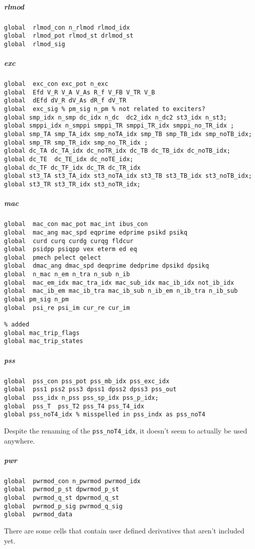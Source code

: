 \documentclass[12pt]{article}
\begin{document}
\subparagraph{rlmod}
\begin{verbatim}
global  rlmod_con n_rlmod rlmod_idx
global  rlmod_pot rlmod_st drlmod_st
global  rlmod_sig
\end{verbatim}
\subparagraph{exc}
\begin{verbatim}
global  exc_con exc_pot n_exc
global  Efd V_R V_A V_As R_f V_FB V_TR V_B
global  dEfd dV_R dV_As dR_f dV_TR
global  exc_sig % pm_sig n_pm % not related to exciters?
global smp_idx n_smp dc_idx n_dc  dc2_idx n_dc2 st3_idx n_st3;
global smppi_idx n_smppi smppi_TR smppi_TR_idx smppi_no_TR_idx ;
global smp_TA smp_TA_idx smp_noTA_idx smp_TB smp_TB_idx smp_noTB_idx;
global smp_TR smp_TR_idx smp_no_TR_idx ;
global dc_TA dc_TA_idx dc_noTR_idx dc_TB dc_TB_idx dc_noTB_idx;
global dc_TE  dc_TE_idx dc_noTE_idx;
global dc_TF dc_TF_idx dc_TR dc_TR_idx
global st3_TA st3_TA_idx st3_noTA_idx st3_TB st3_TB_idx st3_noTB_idx;
global st3_TR st3_TR_idx st3_noTR_idx;
\end{verbatim}
\subparagraph{mac}
\begin{verbatim}
global  mac_con mac_pot mac_int ibus_con
global  mac_ang mac_spd eqprime edprime psikd psikq
global  curd curq curdg curqg fldcur
global  psidpp psiqpp vex eterm ed eq
global  pmech pelect qelect
global  dmac_ang dmac_spd deqprime dedprime dpsikd dpsikq
global  n_mac n_em n_tra n_sub n_ib
global  mac_em_idx mac_tra_idx mac_sub_idx mac_ib_idx not_ib_idx
global  mac_ib_em mac_ib_tra mac_ib_sub n_ib_em n_ib_tra n_ib_sub
global pm_sig n_pm 
global  psi_re psi_im cur_re cur_im

% added
global mac_trip_flags
global mac_trip_states
\end{verbatim}
\subparagraph{pss}
\begin{verbatim}
global  pss_con pss_pot pss_mb_idx pss_exc_idx
global  pss1 pss2 pss3 dpss1 dpss2 dpss3 pss_out
global  pss_idx n_pss pss_sp_idx pss_p_idx;
global  pss_T  pss_T2 pss_T4 pss_T4_idx  
global pss_noT4_idx % misspelled in pss_indx as pss_noT4
\end{verbatim}
Despite the renaming of the \verb|pss_noT4_idx|, it doesn't seem to actually be used anywhere.
\subparagraph{pwr}
\begin{verbatim}
global  pwrmod_con n_pwrmod pwrmod_idx
global  pwrmod_p_st dpwrmod_p_st
global  pwrmod_q_st dpwrmod_q_st
global  pwrmod_p_sig pwrmod_q_sig
global  pwrmod_data
\end{verbatim}
There are some cells that contain user defined derivatives that aren't included yet.
\end{document}
